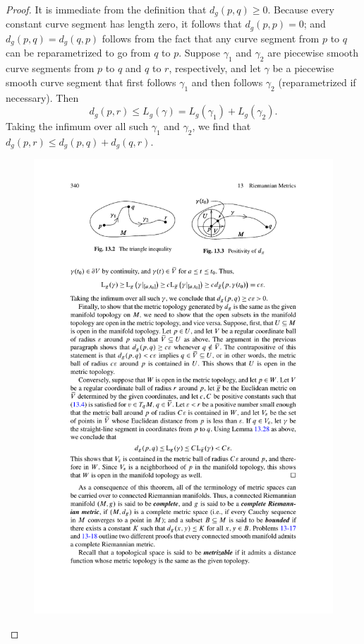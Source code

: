 \begin{proof}
It is immediate from the definition that $d_g(p,q)\geq 0$. Because every constant curve segment has length zero, it follows that $d_g(p,p)=0$; and $d_g(p,q)=d_g(q,p)$ follows from the fact that any curve segment from $p$ to $q$ can be reparametrized to go from $q$ to $p$. Suppose $\gamma_1$ and $\gamma_2$ are piecewise smooth curve segments from $p$ to $q$ and $q$ to $r$, respectively, and let $\gamma$ be a piecewise smooth curve segment that first follows $\gamma_1$ and then follows $\gamma_2$ (reparametrized if necessary). Then
\[d_g(p,r)\leq L_g(\gamma)=L_g(\gamma_1)+L_g(\gamma_2).\]
Taking the infimum over all such $\gamma_1$ and $\gamma_2$, we find that $d_g(p,r)\leq d_g(p,q)+d_g(q,r)$.
\begin{figure}[htbp]
\centering
\begin{minipage}[b]{200pt}
\centering
\includegraphics{pictures/Riemann-metric-1}

\end{minipage}
\end{figure}
\end{proof}
